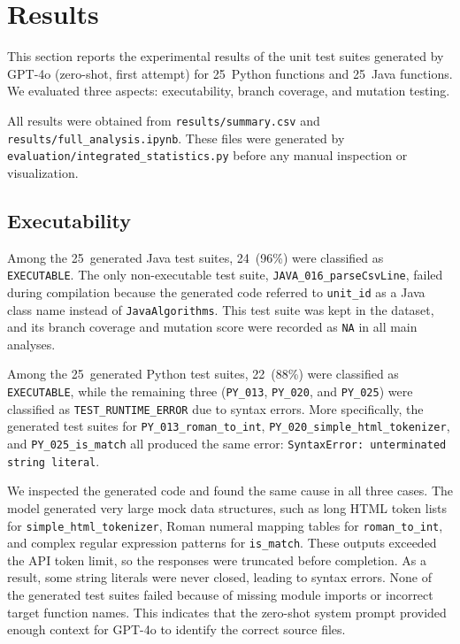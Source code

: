 \section{Results}
\label{sec:results}

This section reports the experimental results of the unit test suites generated by GPT-4o (zero-shot, first attempt) for 25~Python functions and 25~Java functions. We evaluated three aspects: executability, branch coverage, and mutation testing.

All results were obtained from \texttt{results/summary.csv} and \texttt{results/full\_analysis.ipynb}. These files were generated by \texttt{evaluation/integrated\_statistics.py} before any manual inspection or visualization.

\subsection{Executability}
\label{subsec:exec_results}

Among the 25~generated Java test suites, 24~(96\%) were classified as \texttt{EXECUTABLE}. The only non-executable test suite, \texttt{JAVA\_016\_parseCsvLine}, failed during compilation because the generated code referred to \texttt{unit\_id} as a Java class name instead of \texttt{JavaAlgorithms}. This test suite was kept in the dataset, and its branch coverage and mutation score were recorded as \texttt{NA} in all main analyses.

Among the 25~generated Python test suites, 22~(88\%) were classified as \texttt{EXECUTABLE}, while the remaining three (\texttt{PY\_013}, \texttt{PY\_020}, and \texttt{PY\_025}) were classified as \texttt{TEST\_RUNTIME\_ERROR} due to syntax errors.
More specifically, the generated test suites for \texttt{PY\_013\_roman\_to\_int}, \texttt{PY\_020\_simple\_html\_tokenizer}, and \texttt{PY\_025\_is\_match} all produced the same error: \texttt{SyntaxError: unterminated string literal}.

We inspected the generated code and found the same cause in all three cases. The model generated very large mock data structures, such as long HTML token lists for \texttt{simple\_html\_tokenizer}, Roman numeral mapping tables for \texttt{roman\_to\_int}, and complex regular expression patterns for \texttt{is\_match}. These outputs exceeded the API token limit, so the responses were truncated before completion. As a result, some string literals were never closed, leading to syntax errors.
None of the generated test suites failed because of missing module imports or incorrect target function names. This indicates that the zero-shot system prompt provided enough context for GPT-4o to identify the correct source files.

